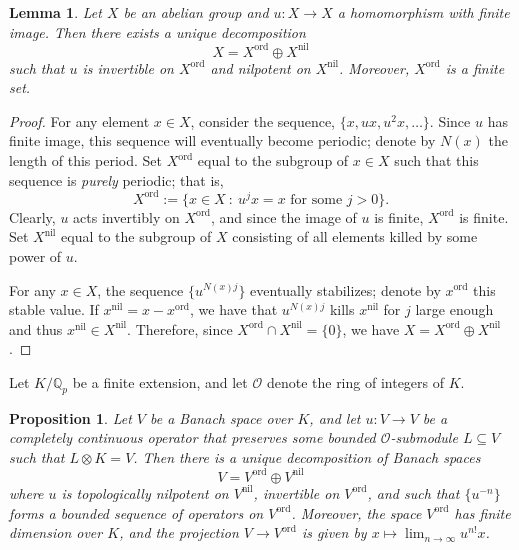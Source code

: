 \documentclass{amsart}
\theoremstyle{plain}
\newtheorem{prop}[thm]{Proposition}
\newtheorem{lemma}[thm]{Lemma}
\theoremstyle{definition}
\renewcommand{\O}{{\mathcal O}}
\newcommand{\Q}{{\mathbb Q}}
\newcommand{\Qp}{\Q_p}
\newcommand{\maps}{\rightarrow}
\DeclareMathOperator{\ord}{ord}
\DeclareMathOperator{\nil}{nil}
\begin{document}
\begin{lemma}
Let $X$ be an abelian group and $u : X  \maps X$ a homomorphism
with finite image.  Then there exists a unique decomposition
$$
X = X^{\ord} \oplus X^{\nil}
$$
such that $u$ is invertible on $X^{\ord}$ and nilpotent on
$X^{\nil}$.  Moreover, $X^{\ord}$ is a finite set.
\end{lemma}

\begin{proof}
For any element $x \in X$, consider the sequence, $\{x, ux, u^2x, \dots \}$.  Since $u$ has finite image, this sequence will
eventually become periodic; denote by $N(x)$ the length of this
period.  Set $X^{\ord}$ equal to the subgroup of $x \in X$ such that
this sequence is {\it purely} periodic; that is,
$$
X^{\ord} := \{ x \in X ~:~ u^j x = x \text{~for~some~}j > 0 \}.
$$
Clearly, $u$ acts invertibly on $X^{\ord}$, and since the image of
$u$ is finite, $X^{\ord}$ is finite. Set $X^{\nil}$ equal to the
subgroup of $X$ consisting of all elements killed by some power of
$u$.

For any $x \in X$, the sequence $\{ u^{N(x)j} \}$ eventually
stabilizes; denote by $x^{\ord}$ this stable value.  If
$x^{\nil} = x - x^{\ord}$, we have that $u^{N(x) j}$ kills
$x^{\nil}$ for $j$ large enough and thus $x^{\nil} \in X^{\nil}$.
Therefore, since $X^{\ord} \cap X^{\nil} = \{0\}$, we have $X =
X^{\ord} \oplus X^{\nil}$.
\end{proof}

Let $K/\Qp$ be a finite extension, and let $\O$ denote the ring of integers of $K$.

\begin{prop}
\label{prop:decomp} Let $V$ be a Banach space over $K$, and let
$u: V \maps V$ be a completely continuous operator that preserves
some bounded $\O$-submodule $L \subseteq V$ such that $L \otimes K = V$. Then there is a unique decomposition of Banach spaces
$$
V = V^{\ord} \oplus V^{\nil}
$$
where $u$ is topologically nilpotent on $V^{\nil}$, invertible on
$V^{\ord}$, and such that $\{u^{-n}\}$ forms a bounded sequence of
operators on $V^{\ord}$.  Moreover, the space $V^{\ord}$ has
finite dimension over $K$, and the projection $V \maps V^{\ord}$
is given by $\displaystyle x \mapsto \lim_{n \maps \infty}
u^{n!}x$.
\end{prop}
\end{document}
